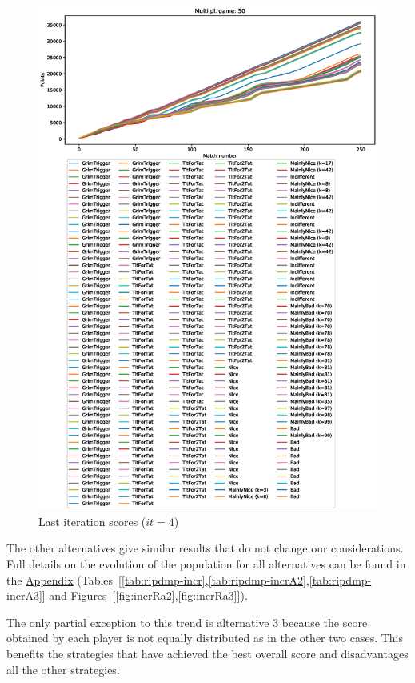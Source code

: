\documentclass[journal,10pt,twoside]{IEEEtran}
\begin{document}
\begin{figure}[!ht]
    \centering
    \includegraphics[width=1\columnwidth]{../img/ripdmp-incr/alt1/ripdmp-scores-increasing-pop-50-r4}
    \caption{Last iteration scores ($it=4$)}
    \label{fig:incrLI}
\end{figure}

The other alternatives give similar results that do not change our considerations. Full details on the evolution of the population for all alternatives can be found in the \hyperref[s:appendix]{Appendix} (Tables~[\ref{tab:ripdmp-incr},\ref{tab:ripdmp-incrA2},\ref{tab:ripdmp-incrA3}] and Figures~[\ref{fig:incrRa2},\ref{fig:incrRa3}]). 

The only partial exception to this trend is alternative 3 because the score obtained by each player is not equally distributed as in the other two cases. This benefits the strategies that have achieved the best overall score and disadvantages all the other strategies.
\end{document}
